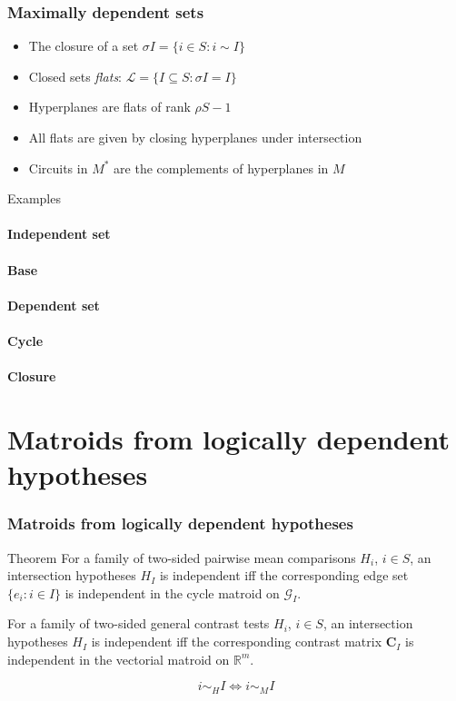 \documentclass[bigger]{beamer}
\newcommand{\bs}[1]{\bm{#1}}
\begin{document}
\begin{frame}
\frametitle{Maximally dependent sets}
\begin{itemize}
\item The closure of a set $\sigma I = \{i \in S: i \sim I\}$
\item Closed sets {\em flats}: $\mathscr{L} = \{I \subseteq S: \sigma I = I\}$
\item Hyperplanes are flats of rank $\rho S - 1$
\item All flats are given by closing hyperplanes under intersection
\item Circuits in $M^*$ are the complements of hyperplanes in $M$
\end{itemize} %
\end{frame}



\begin{frame}{Examples}
\framesubtitle<1>{Independent set}  
\framesubtitle<2>{Base}  
\framesubtitle<4>{Dependent set}  
\framesubtitle<3>{Cycle}  
\framesubtitle<5>{Closure}  
\end{frame}

\section{Matroids from logically dependent hypotheses}



\begin{frame}
\frametitle{Matroids from logically dependent hypotheses}

  \begin{block}{Theorem}
    For a family of two-sided pairwise mean comparisons $H_i$, $i \in
    S$, an intersection hypotheses $H_I$ is independent iff the
    corresponding edge set $\{e_i:i \in I\}$ is independent in the
    cycle matroid on $\mathscr{G}_I$.  

For a family of two-sided
    general contrast tests $H_i$, $i \in S$, an intersection
    hypotheses $H_I$ is independent iff the corresponding contrast
    matrix $\bs{C}_I$ is independent in the vectorial matroid on
    $\mathbb{R}^m$.

    \begin{displaymath}
      i \sim_H I \Leftrightarrow i \sim_M I
    \end{displaymath}
  \end{block}


\end{frame}
\end{document}
